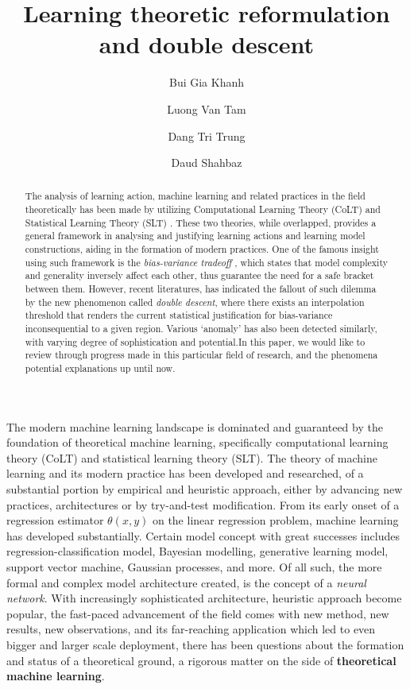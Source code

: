 \documentclass[
  journal=largetwo,
  year=2025,
  volume=37,
]{cup-journal}
\title{Learning theoretic reformulation and double descent}
\author{Bui Gia Khanh}
\affiliation{Department of Physics, Hanoi University of Science, Vietnam National University, Hanoi Vietnam}
\author{Luong Van Tam}
\affiliation{Department of Physics, Hanoi University of Science, Vietnam National University, Hanoi Vietnam}
\author{Dang Tri Trung}
\affiliation{Monash University, Department of Computer Science, Melbourne, Australia}
\author{Daud Shahbaz}
\affiliation{COMSATS University Islamabad, Islamabad, Pakistan}
\begin{document}
\begin{abstract}
    The analysis of learning action, machine learning and related practices in the field theoretically has been made by utilizing Computational Learning Theory (CoLT) \cite{10.1145/1968.1972} and Statistical Learning Theory (SLT) \cite{Vapnik1999-VAPTNO}. These two theories, while overlapped, provides a general framework in analysing and justifying learning actions and learning model constructions, aiding in the formation of modern practices. One of the famous insight using such framework is the \textit{bias-variance tradeoff} \cite{6797087}, which states that model complexity and generality inversely affect each other, thus guarantee the need for a safe bracket between them. However, recent literatures, \cite{belkin_reconciling_2019} has indicated the fallout of such dilemma by the new phenomenon called \textit{double descent}, where there exists an interpolation threshold that renders the current statistical justification for bias-variance inconsequential to a given region. Various `anomaly' has also been detected similarly, with varying degree of sophistication and potential.In this paper, we would like to review through progress made in this particular field of research, and the phenomena potential explanations up until now. 
\end{abstract}

The modern machine learning landscape is dominated and guaranteed by the foundation of theoretical machine learning, specifically computational learning theory (CoLT) and statistical learning theory (SLT). The theory of machine learning and its modern practice has been developed and researched, of a substantial portion by empirical and heuristic approach, either by advancing new practices, architectures or by try-and-test modification. From its early onset of a regression estimator $\theta(x,y)$ on the linear regression problem, machine learning has developed substantially. Certain model concept with great successes includes regression-classification model, Bayesian modelling, generative learning model, support vector machine, Gaussian processes, and more. Of all such, the more formal and complex model architecture created, is the concept of a \textit{neural network}. With increasingly sophisticated architecture, heuristic approach become popular, the fast-paced advancement of the field comes with new method, new results, new observations, and its far-reaching application which led to even bigger and larger scale deployment, there has been questions about the formation and status of a theoretical ground, a rigorous matter on the side of \textbf{theoretical machine learning}.
\end{document}

